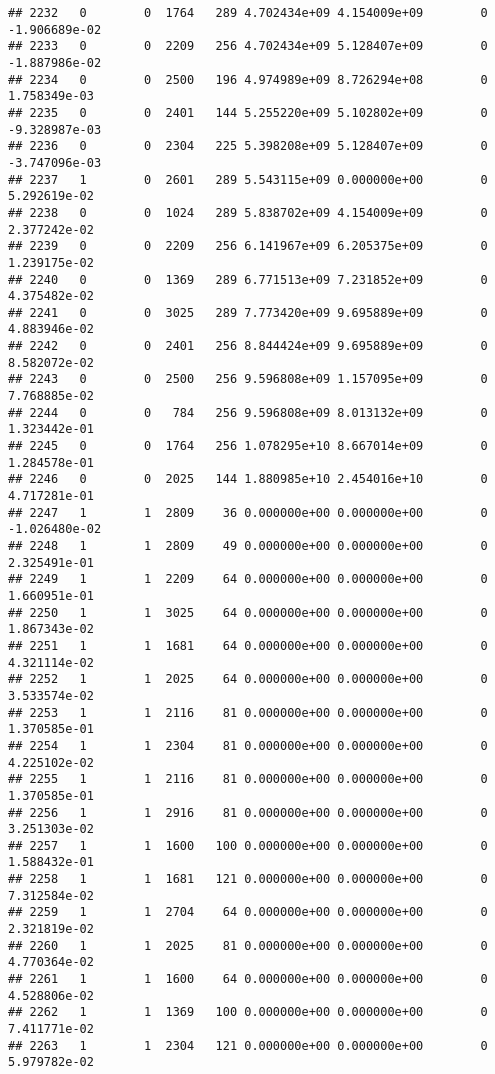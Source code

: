 \documentclass[
]{article}
\begin{document}
\begin{enumerate}
\begin{verbatim}
## 2232   0        0  1764   289 4.702434e+09 4.154009e+09        0 -1.906689e-02
## 2233   0        0  2209   256 4.702434e+09 5.128407e+09        0 -1.887986e-02
## 2234   0        0  2500   196 4.974989e+09 8.726294e+08        0  1.758349e-03
## 2235   0        0  2401   144 5.255220e+09 5.102802e+09        0 -9.328987e-03
## 2236   0        0  2304   225 5.398208e+09 5.128407e+09        0 -3.747096e-03
## 2237   1        0  2601   289 5.543115e+09 0.000000e+00        0  5.292619e-02
## 2238   0        0  1024   289 5.838702e+09 4.154009e+09        0  2.377242e-02
## 2239   0        0  2209   256 6.141967e+09 6.205375e+09        0  1.239175e-02
## 2240   0        0  1369   289 6.771513e+09 7.231852e+09        0  4.375482e-02
## 2241   0        0  3025   289 7.773420e+09 9.695889e+09        0  4.883946e-02
## 2242   0        0  2401   256 8.844424e+09 9.695889e+09        0  8.582072e-02
## 2243   0        0  2500   256 9.596808e+09 1.157095e+09        0  7.768885e-02
## 2244   0        0   784   256 9.596808e+09 8.013132e+09        0  1.323442e-01
## 2245   0        0  1764   256 1.078295e+10 8.667014e+09        0  1.284578e-01
## 2246   0        0  2025   144 1.880985e+10 2.454016e+10        0  4.717281e-01
## 2247   1        1  2809    36 0.000000e+00 0.000000e+00        0 -1.026480e-02
## 2248   1        1  2809    49 0.000000e+00 0.000000e+00        0  2.325491e-01
## 2249   1        1  2209    64 0.000000e+00 0.000000e+00        0  1.660951e-01
## 2250   1        1  3025    64 0.000000e+00 0.000000e+00        0  1.867343e-02
## 2251   1        1  1681    64 0.000000e+00 0.000000e+00        0  4.321114e-02
## 2252   1        1  2025    64 0.000000e+00 0.000000e+00        0  3.533574e-02
## 2253   1        1  2116    81 0.000000e+00 0.000000e+00        0  1.370585e-01
## 2254   1        1  2304    81 0.000000e+00 0.000000e+00        0  4.225102e-02
## 2255   1        1  2116    81 0.000000e+00 0.000000e+00        0  1.370585e-01
## 2256   1        1  2916    81 0.000000e+00 0.000000e+00        0  3.251303e-02
## 2257   1        1  1600   100 0.000000e+00 0.000000e+00        0  1.588432e-01
## 2258   1        1  1681   121 0.000000e+00 0.000000e+00        0  7.312584e-02
## 2259   1        1  2704    64 0.000000e+00 0.000000e+00        0  2.321819e-02
## 2260   1        1  2025    81 0.000000e+00 0.000000e+00        0  4.770364e-02
## 2261   1        1  1600    64 0.000000e+00 0.000000e+00        0  4.528806e-02
## 2262   1        1  1369   100 0.000000e+00 0.000000e+00        0  7.411771e-02
## 2263   1        1  2304   121 0.000000e+00 0.000000e+00        0  5.979782e-02

\end{verbatim}
\end{enumerate}
\end{document}
